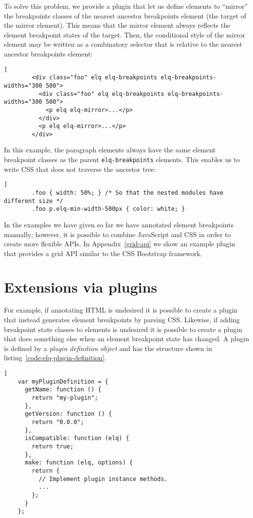 \documentclass[]{llncs}
\newcommand{\code}[1]{\texttt{#1}}
\begin{document}
      To solve this problem, we provide a plugin that let us define elements to ``mirror'' the breakpoints classes of the nearest ancestor breakpoints element (the target of the mirror element).
      This means that the mirror element always reflects the element breakpoint states of the target.
      Then, the conditional style of the mirror element may be written as a combinatory selector that is relative to the nearest ancestor breakpoints element:

      \begin{lstlisting}[gobble=8,caption={},captionpos=b,label={}]]
        <div class="foo" elq elq-breakpoints elq-breakpoints-widths="300 500">
          <div class="foo" elq elq-breakpoints elq-breakpoints-widths="300 500">
            <p elq elq-mirror>...</p>
          </div>
          <p elq elq-mirror>...</p>
        </div>
      \end{lstlisting}

      \noindent
      In this example, the paragraph elements always have the same element breakpoint classes as the parent \code{elq-breakpoints} elements.
      This enables us to write CSS that does not traverse the ancestor tree:

      \begin{lstlisting}[gobble=8,caption={},captionpos=b,label={code:elq-mirror-example-css}]]
        .foo { width: 50%; } /* So that the nested modules have different size */
        .foo p.elq-min-width-500px { color: white; }
      \end{lstlisting}

      \noindent
      In the examples we have given so far we have annotated element breakpoints manually; however, it is possible to combine JavaScript and CSS in order to create more flexible APIs.
      In Appendix~\ref{grid-api} we show an example plugin that provides a grid API similar to the CSS Bootstrap framework.

\section{Extensions via plugins}\label{sec:plugins}
  For example, if annotating HTML is undesired it is possible to create a plugin that instead generates element breakpoints by parsing CSS.
  Likewise, if adding breakpoint state classes to elements is undesired it is possible to create a plugin that does something else when an element breakpoint state has changed.
  A plugin is defined by a \emph{plugin definition object} and has the structure shown in listing~\ref{code:elq-plugin-definition}.
  \begin{lstlisting}[gobble=4,caption={The structure of plugin definition objects.},captionpos=b,label={code:elq-plugin-definition}]]
    var myPluginDefinition = {
      getName: function () {
        return "my-plugin";
      },
      getVersion: function () {
        return "0.0.0";
      },
      isCompatible: function (elq) {
        return true;
      },
      make: function (elq, options) {
        return {
          // Implement plugin instance methods.
          ...
        };
      }
    };
  \end{lstlisting}
\end{document}
